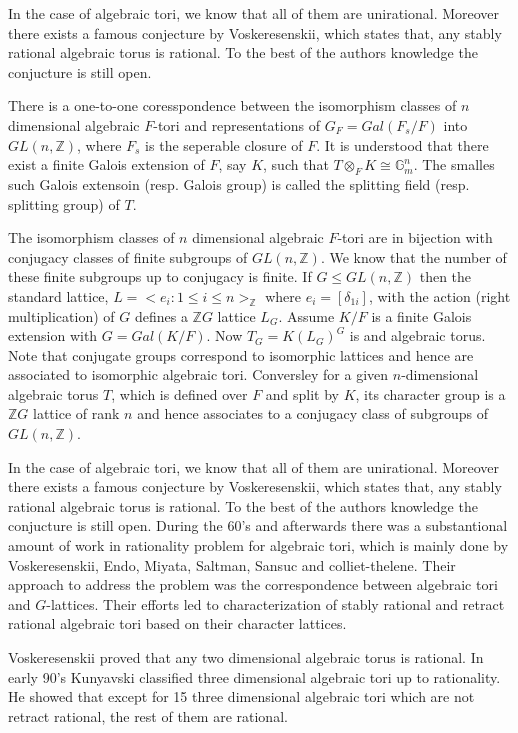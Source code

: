 \documentclass{article}
\theoremstyle{plain}
\theoremstyle{definition}
\newcommand{\Z}{\ensuremath{\mathbb{Z}}}
\begin{document}
In the case of algebraic tori, we know that all of them are unirational. 
Moreover there exists a famous conjecture by Voskeresenskii,
which states that, any stably rational algebraic torus is rational. To the 
best of the authors knowledge the conjucture is still open. 

There is a one-to-one coresspondence between the isomorphism classes of 
$n$ dimensional algebraic $F$-tori and representations of $G_F = Gal(F_s/F)$ 
into $GL(n,\Z)$, where $F_s$ is the seperable closure of $F$. It is understood 
that there exist a finite Galois extension of $F$, say $K$, such that 
$T \otimes_F K \cong \mathbb{G}_{m}^n$. The smalles such Galois extensoin 
(resp. Galois group) is called the splitting field (resp. splitting group)
 of $T$.
 
The isomorphism classes of $n$ dimensional algebraic $F$-tori are in bijection 
with conjugacy classes of finite subgroups of $GL(n,\Z)$. We know that the number 
of these finite subgroups up to conjugacy is finite. If $G \leq GL(n,\Z)$ then 
the standard lattice, $L = <e_i: 1 \leq i \leq n>_\Z$ where $e_i = [\delta_{1i}]$,
with the action (right multiplication) of $G$ defines a $\Z G$ lattice $L_G$. 
Assume $K/F$ is a finite Galois extension with $G = Gal(K/F)$. Now $T_G = K(L_G)^G$
is and algebraic torus. Note that conjugate groups correspond to isomorphic 
lattices and hence are associated to isomorphic algebraic tori. Conversley for 
a given $n$-dimensional algebraic torus $T$, which is defined over $F$ and split 
by $K$, its character group is a $\Z G$ lattice of rank $n$ and hence associates 
to a conjugacy class of subgroups of $GL(n,\Z)$.  

In the case of algebraic tori, we know that all of them are unirational. 
Moreover there exists a famous conjecture by Voskeresenskii,
which states that, any stably rational algebraic torus is rational. To the 
best of the authors knowledge the conjucture is still open. During the 60's and
afterwards there was a substantional amount of work in rationality problem 
for algebraic tori, which is mainly done by Voskeresenskii, Endo, Miyata, Saltman, 
Sansuc and colliet-thelene. Their approach to address the problem was the
correspondence between algebraic tori and $G$-lattices. Their efforts led to 
characterization of stably rational and retract rational algebraic tori based 
on their character lattices.

Voskeresenskii proved that any two dimensional algebraic torus is rational. 
In early 90's Kunyavski classified three dimensional algebraic tori up to 
rationality. He showed that except for 15 three dimensional algebraic tori 
which are not retract rational, the rest of them are rational.
\end{document}
